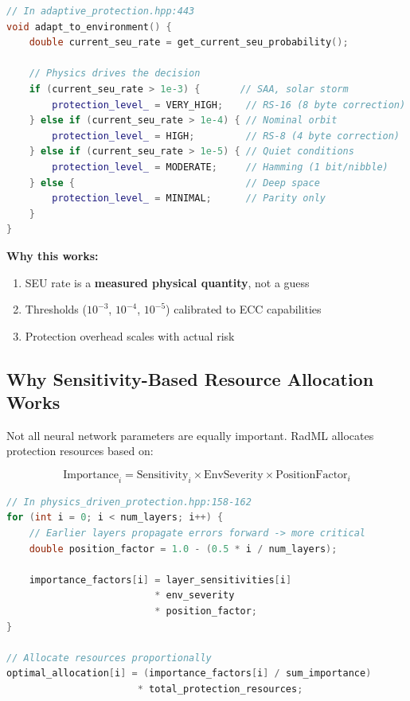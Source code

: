 \documentclass[11pt,a4paper]{article}
\begin{document}
\begin{lstlisting}[language=C++, basicstyle=\footnotesize\ttfamily]
// In adaptive_protection.hpp:443
void adapt_to_environment() {
    double current_seu_rate = get_current_seu_probability();

    // Physics drives the decision
    if (current_seu_rate > 1e-3) {       // SAA, solar storm
        protection_level_ = VERY_HIGH;    // RS-16 (8 byte correction)
    } else if (current_seu_rate > 1e-4) { // Nominal orbit
        protection_level_ = HIGH;         // RS-8 (4 byte correction)
    } else if (current_seu_rate > 1e-5) { // Quiet conditions
        protection_level_ = MODERATE;     // Hamming (1 bit/nibble)
    } else {                              // Deep space
        protection_level_ = MINIMAL;      // Parity only
    }
}
\end{lstlisting}

\textbf{Why this works:}
\begin{enumerate}
    \item SEU rate is a \textbf{measured physical quantity}, not a guess
    \item Thresholds ($10^{-3}$, $10^{-4}$, $10^{-5}$) calibrated to ECC capabilities
    \item Protection overhead scales with actual risk
\end{enumerate}

\subsection{Why Sensitivity-Based Resource Allocation Works}

Not all neural network parameters are equally important. RadML allocates protection resources based on:

\begin{equation}
\text{Importance}_i = \text{Sensitivity}_i \times \text{EnvSeverity} \times \text{PositionFactor}_i
\end{equation}

\begin{lstlisting}[language=C++, basicstyle=\footnotesize\ttfamily]
// In physics_driven_protection.hpp:158-162
for (int i = 0; i < num_layers; i++) {
    // Earlier layers propagate errors forward -> more critical
    double position_factor = 1.0 - (0.5 * i / num_layers);

    importance_factors[i] = layer_sensitivities[i]
                          * env_severity
                          * position_factor;
}

// Allocate resources proportionally
optimal_allocation[i] = (importance_factors[i] / sum_importance)
                       * total_protection_resources;
\end{lstlisting}
\end{document}
